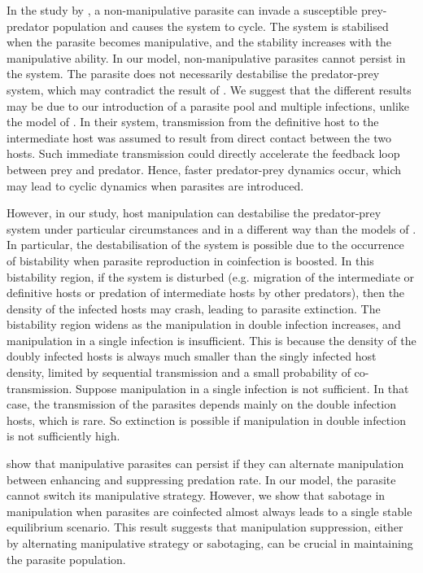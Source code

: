 \documentclass[11pt]{article}
\begin{document}
In the study by \cite{Rogawa2018}, a non-manipulative parasite can invade a susceptible prey-predator population and causes the system to cycle. 
The system is stabilised when the parasite becomes manipulative, and the stability increases with the manipulative ability.
In our model, non-manipulative parasites cannot persist in the system. The parasite does not necessarily destabilise the predator-prey system, which may contradict the result of \cite{Rogawa2018}. 
We suggest that the different results may be due to our introduction of a parasite pool and multiple infections, unlike the model of \cite{Rogawa2018}. 
In their system, transmission from the definitive host to the intermediate host was assumed to result from direct contact between the two hosts. 
Such immediate transmission could directly accelerate the feedback loop between prey and predator. 
Hence, faster predator-prey dynamics occur, which may lead to cyclic dynamics when parasites are introduced.

However, in our study, host manipulation can destabilise the predator-prey system under particular circumstances and in a different way than the models of \cite{Rogawa2018}. 
In particular, the destabilisation of the system is possible due to the occurrence of bistability when parasite reproduction in coinfection is boosted. 
In this bistability region, if the system is disturbed (e.g. migration of the intermediate or definitive hosts or predation of intermediate hosts by other predators), then the density of the infected hosts may crash, leading to parasite extinction. 
The bistability region widens as the manipulation in double infection increases, and manipulation in a single infection is insufficient. 
This is because the density of the doubly infected hosts is always much smaller than the singly infected host density, limited by sequential transmission and a small probability of co-transmission. 
Suppose manipulation in a single infection is not sufficient. 
In that case, the transmission of the parasites depends mainly on the double infection hosts, which is rare. 
So extinction is possible if manipulation in double infection is not sufficiently high.

\cite{Iritani2018} show that manipulative parasites can persist if they can alternate manipulation between enhancing and suppressing predation rate. 
In our model, the parasite cannot switch its manipulative strategy. However, we show that sabotage in manipulation when parasites are coinfected almost always leads to a single stable equilibrium scenario. 
This result suggests that manipulation suppression, either by alternating manipulative strategy or sabotaging, can be crucial in maintaining the parasite population.
\end{document}
